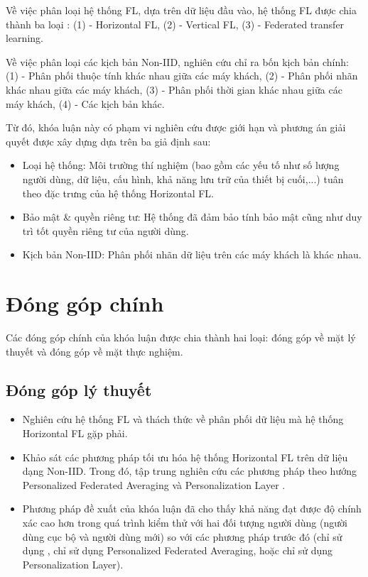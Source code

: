 Về việc phân loại hệ thống FL, dựa trên dữ liệu đầu vào, hệ thống FL được chia thành ba loại \cite{yin2021comprehensive}: (1) - Horizontal FL, (2) - Vertical FL, (3) - Federated transfer learning.

Về việc phân loại các kịch bản Non-IID, nghiên cứu \cite{zhu2021federated} chỉ ra bốn kịch bản chính: (1) - Phân phối thuộc tính khác nhau giữa các máy khách, (2) - Phân phối nhãn khác nhau giữa các máy khách, (3) - Phân phối thời gian khác nhau giữa các máy khách, (4) - Các kịch bản khác.

Từ đó, khóa luận này có phạm vi nghiên cứu được giới hạn và phương án giải quyết được xây dựng dựa trên ba giả định sau:

\begin{itemize}
    \item Loại hệ thống: Môi trường thí nghiệm (bao gồm các yếu tố như số lượng người dùng, dữ liệu, cấu hình, khả năng lưu trữ của thiết bị cuối,...) tuân theo đặc trưng của hệ thống Horizontal FL.
    \item Bảo mật \& quyền riêng tư: Hệ thống đã đảm bảo tính bảo mật cũng như duy trì tốt quyền riêng tư của người dùng.
    \item Kịch bản Non-IID: Phân phối nhãn dữ liệu trên các máy khách là khác nhau.
\end{itemize}

\section{Đóng góp chính}

Các đóng góp chính của khóa luận được chia thành hai loại: đóng góp về mặt lý thuyết và đóng góp về mặt thực nghiệm.

\subsection{Đóng góp lý thuyết}

\begin{itemize}
    \item Nghiên cứu hệ thống FL và thách thức về phân phối dữ liệu mà hệ thống Horizontal FL gặp phải.
    \item Khảo sát các phương pháp tối ưu hóa hệ thống Horizontal FL trên dữ liệu dạng Non-IID. Trong đó, tập trung nghiên cứu các phương pháp theo hướng Personalized Federated Averaging \parencite{fallah2020personalized, chen2018federated} và Personalization Layer \parencite{liang2020think, arivazhagan2019federated}.
    \item Phương pháp đề xuất của khóa luận đã cho thấy khả năng đạt được độ chính xác cao hơn trong quá trình kiểm thử với hai đối tượng người dùng (người dùng cục bộ và người dùng mới) so với các phương pháp trước đó (chỉ sử dụng , chỉ sử dụng Personalized Federated Averaging, hoặc chỉ sử dụng Personalization Layer).
\end{itemize}

